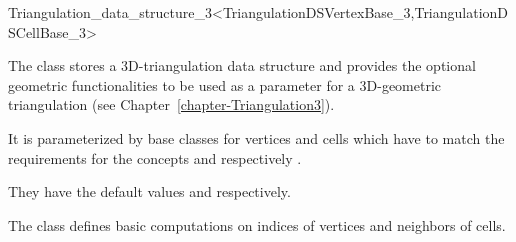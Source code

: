 

\begin{ccRefClass}{Triangulation_data_structure_3<TriangulationDSVertexBase_3,TriangulationDSCellBase_3>}

\ccDefinition
The class  stores a 3D-triangulation data
structure and provides the optional
geometric functionalities to be used as a parameter for a 
3D-geometric triangulation (see Chapter~\ref{chapter-Triangulation3}). 


\ccParameters
It is parameterized by base classes for vertices and cells which have to match
the requirements for the concepts  and
 respectively
.

They have the default values  and
 respectively.

\ccIsModel {}


The class  defines basic computations on
indices of vertices and neighbors of cells. 

\ccSeeAlso

\\
\\
\\

\end{ccRefClass}
